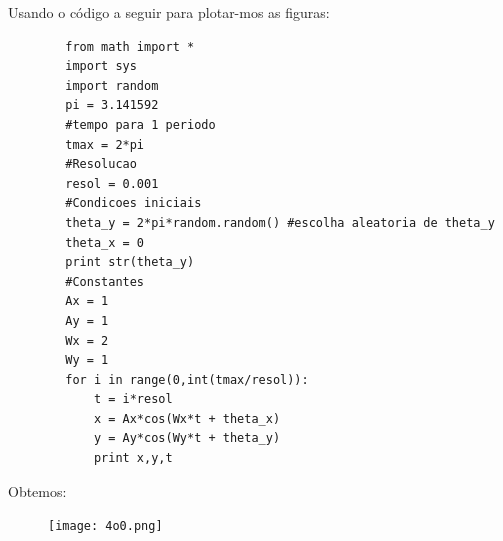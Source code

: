 \documentclass[a4paper,12pt]{exam}
\begin{document}
	Usando o código a seguir para plotar-mos as figuras:
	\begin{lstlisting}
		from math import *
		import sys
		import random
		pi = 3.141592
		#tempo para 1 periodo
		tmax = 2*pi
		#Resolucao
		resol = 0.001
		#Condicoes iniciais
		theta_y = 2*pi*random.random() #escolha aleatoria de theta_y
		theta_x = 0
		print str(theta_y)
		#Constantes
		Ax = 1
		Ay = 1
		Wx = 2
		Wy = 1
		for i in range(0,int(tmax/resol)):
			t = i*resol
			x = Ax*cos(Wx*t + theta_x)
			y = Ay*cos(Wy*t + theta_y)
			print x,y,t
	\end{lstlisting}
Obtemos:
			\begin{figure}[wlh]
			\centering
			\texttt{[image: 4o0.png]}
		\end{figure}
		
\end{document}
